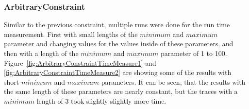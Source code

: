 \subsubsection{ArbitraryConstraint}
	Similar to the previous constraint, multiple runs were done for the run time measurement. First with small lengths of the $minimum$ and $maximum$ parameter and changing values for the values inside of these parameters, and then with a length of the $minimum$ and $maximum$ parameter of 1 to 100. Figure~\ref{fig:ArbitraryConstraintTimeMeasure1} and \ref{fig:ArbitraryConstraintTimeMeasure2} are showing some of the results with short $minimum$ and $maximum$ parameters. It can be seen, that the results with the same length of these parameters are nearly constant, but the traces with a $minimum$ length of 3 took slightly slightly more time.%
